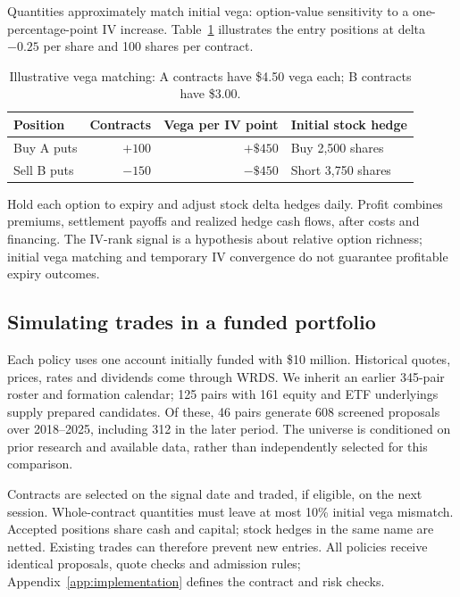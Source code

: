 \documentclass[11pt,letterpaper]{article}
\newcommand{\money}[1]{\$#1}
\begin{document}
Quantities approximately match initial vega: option-value sensitivity to a
one-percentage-point IV increase. Table~\ref{tab:trade} illustrates the entry
positions at delta $-0.25$ per share and 100 shares per contract.
\begin{table}[H]
\centering\small
\begin{tabular}{lrrl}
\toprule
Position & Contracts & Vega per IV point & Initial stock hedge\\
\midrule
Buy A puts & $+100$ & $+\money{450}$ & Buy 2,500 shares\\
Sell B puts & $-150$ & $-\money{450}$ & Short 3,750 shares\\
\bottomrule
\end{tabular}
\caption{Illustrative vega matching: A contracts have \money{4.50} vega each;
B contracts have \money{3.00}.}
\label{tab:trade}
\end{table}

Hold each option to expiry and adjust stock delta hedges daily. Profit combines
premiums, settlement payoffs and realized hedge cash flows, after costs and
financing. The IV-rank signal is a hypothesis about relative option richness;
initial vega matching and temporary IV convergence do not guarantee profitable
expiry outcomes.

\clearpage
\subsection{Simulating trades in a funded portfolio}
\label{sec:execution}
Each policy uses one account initially funded with \money{10 million}.
Historical quotes, prices, rates and dividends come through WRDS. We inherit
an earlier 345-pair roster and formation calendar; 125 pairs with 161 equity
and ETF underlyings supply prepared candidates. Of these, 46 pairs generate
608 screened proposals over 2018--2025, including 312 in the later period.
The universe is conditioned on prior research and available data, rather
than independently selected for this comparison.

Contracts are selected on the signal date and traded, if eligible, on the
next session. Whole-contract quantities must leave at most 10\% initial vega
mismatch. Accepted positions share cash and capital; stock hedges in the same
name are netted. Existing trades can therefore prevent new entries. All
policies receive identical proposals, quote checks and admission rules;
Appendix~\ref{app:implementation} defines the contract and risk checks.
\end{document}
